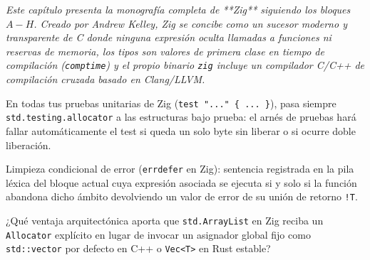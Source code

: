 \documentclass{book}
\begin{document}
\noindent\textit{Este capítulo presenta la monografía completa de **Zig** siguiendo los bloques \(A-H\). Creado por Andrew Kelley, Zig se concibe como un sucesor moderno y transparente de C donde ninguna expresión oculta llamadas a funciones ni reservas de memoria, los tipos son valores de primera clase en tiempo de compilación (\texttt{comptime}) y el propio binario \texttt{zig} incluye un compilador C/C++ de compilación cruzada basado en Clang/LLVM.}

\begin{tcolorbox}[title={Consejo}, studiumtip, breakable]

En todas tus pruebas unitarias de Zig (\texttt{test "..." \{ ... \}}), pasa siempre \texttt{std.testing.allocator} a las estructuras bajo prueba: el arnés de pruebas hará fallar automáticamente el test si queda un solo byte sin liberar o si ocurre doble liberación.
\end{tcolorbox}

\begin{tcolorbox}[title={Definición}, studiumdef, breakable]

Limpieza condicional de error (\texttt{errdefer} en Zig): sentencia registrada en la pila léxica del bloque actual cuya expresión asociada se ejecuta si y solo si la función abandona dicho ámbito devolviendo un valor de error de su unión de retorno \texttt{!T}.
\end{tcolorbox}

\begin{tcolorbox}[title={Autoficha}, studiumcheck, breakable]

¿Qué ventaja arquitectónica aporta que \texttt{std.ArrayList} en Zig reciba un \texttt{Allocator} explícito en lugar de invocar un asignador global fijo como \texttt{std::vector} por defecto en C++ o \texttt{Vec<T>} en Rust estable?
\end{tcolorbox}
\end{document}
